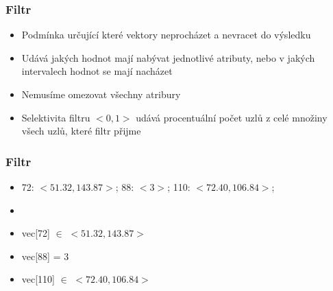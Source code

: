 \documentclass{beamer}
\begin{document}
	\begin{frame}
		\frametitle{Filtr}
		
		\begin{itemize}
			\item Podmínka určující které vektory neprocházet a nevracet do výsledku
			\item Udává jakých hodnot mají nabývat jednotlivé atributy, nebo v jakých intervalech hodnot se mají nacházet
			\item Nemusíme omezovat všechny atribury
			\item Selektivita filtru $<0,1>$ udává procentuální počet uzlů z celé množiny všech uzlů, které filtr přijme
			
		\end{itemize}
		
	\end{frame}

	\begin{frame}
		\frametitle{Filtr}
		
		\begin{itemize}
			\item 72: $<51.32,143.87>$; 88: $<3>$; 110: $<72.40,106.84>$;
			\item[]
			\item vec[72] $\in$ $<51.32,143.87>$
			\item vec[88] = 3
			\item vec[110]  $\in$ $<72.40,106.84>$
		\end{itemize}
		
	\end{frame}
\end{document}
